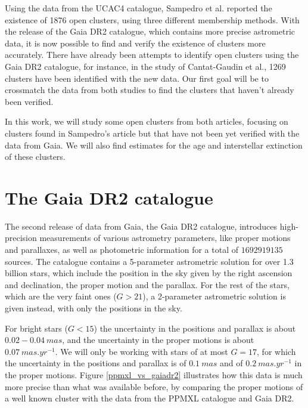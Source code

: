 \documentclass[twocolumn]{revtex4}
\begin{document}
Using the data from the UCAC4 catalogue, Sampedro et al.\cite{sampedro} reported the existence of 1876 open clusters, using three different membership methods. With the release of the Gaia DR2 catalogue, which contains more precise astrometric data, it is now possible to find and verify the existence of clusters more accurately.
There have already been attempts to identify open clusters using the Gaia DR2 catalogue, for instance, in the study of Cantat-Gaudin et al.\cite{cantat-gaudin}, 1269 clusters have been identified with the new data. Our first goal will be to crossmatch the data from both studies to find the clusters that haven't already been verified.

In this work, we will study some open clusters from both articles, focusing on clusters found in Sampedro's article but that have not been yet verified with the data from Gaia. We will also find estimates for the age and interstellar extinction of these clusters.


\section{The Gaia DR2 catalogue}
The second release of data from Gaia, the Gaia DR2 catalogue\cite{gaiadr2}, introduces high-precision measurements of various astrometry parameters, like proper motions and parallaxes, as well as photometric information for a total of $1 692 919 135$ sources. The catalogue contains a 5-parameter astrometric solution for over 1.3 billion stars, which include the position in the sky given by the right ascension and declination, the proper motion and the parallax. For the rest of the stars, which are the very faint ones ($G > 21$), a 2-parameter astrometric solution is given instead, with only the positions in the sky.

For bright stars ($G < 15$) the uncertainty in the positions and parallax is about $0.02-0.04\ \si{mas}$, and the uncertainty in the proper motions is about $0.07\ \si{mas.yr^{-1}}$. We will only be working with stars of at most $G = 17$, for which the uncertainty in the positions and parallax is of $0.1\ \si{mas}$ and of $0.2\ \si{mas.yr^{-1}}$ in the proper motions. Figure \ref{ppmxl_vs_gaiadr2} illustrates how this data is much more precise than what was available before, by comparing the proper motions of a well known cluster with the data from the PPMXL catalogue\cite{ppmxl} and Gaia DR2.
\end{document}
